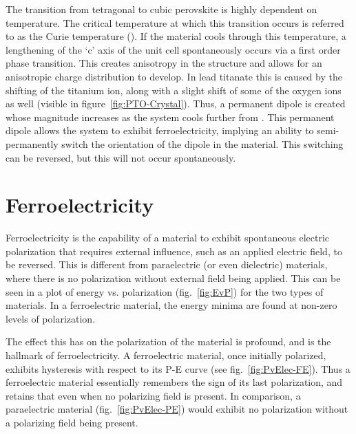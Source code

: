 The transition from tetragonal to cubic perovskite is highly dependent on temperature. The critical temperature at which this transition occurs is referred to as the Curie temperature (\Tc{}). If the material cools through this temperature, a lengthening of the `c' axis of the unit cell spontaneously occurs via a first order phase transition. This creates anisotropy in the structure and allows for an anisotropic charge distribution to develop. In lead titanate this is caused by the shifting of the titanium ion, along with a slight shift of some of the oxygen ions as well (visible in figure~\vref{fig:PTO-Crystal}). Thus, a permanent dipole is created whose magnitude increases as the system cools further from \Tc{}. This permanent dipole allows the system to exhibit ferroelectricity, implying an ability to semi-permanently switch the orientation of the dipole in the material. This switching can be reversed, but this will not occur spontaneously.\cite{pan_abnormal_2001,kolpak_polarization_2007,park_effect_2009,lee_unusual_2010}



\section{Ferroelectricity}
\label{sec:Materials-Ferro}

Ferroelectricity is the capability of a material to exhibit spontaneous electric polarization that requires external influence, such as an applied electric field, to be reversed. This is different from paraelectric (or even dielectric) materials, where there is no polarization without external field being applied. This can be seen in a plot of energy vs. polarization (fig.~\vref{fig:EvP}) for the two types of materials. In a ferroelectric material, the energy minima are found at non-zero levels of polarization.\cite{gonzalo_effective_2006,rabe_modern_2007} 

The effect this has on the polarization of the material is profound, and is the hallmark of ferroelectricity. A ferroelectric material, once initially polarized, exhibits hysteresis with respect to its P-E curve (see fig.~\ref{fig:PvElec-FE}). Thus a ferroelectric material essentially remembers the sign of its last polarization, and retains that even when no polarizing field is present. In comparison, a paraelectric material (fig.~\ref{fig:PvElec-PE}) would exhibit no polarization without a polarizing field being present.\cite{gonzalo_effective_2006,Nonnenmann_2012,rabe_modern_2007,Coster_2011}


